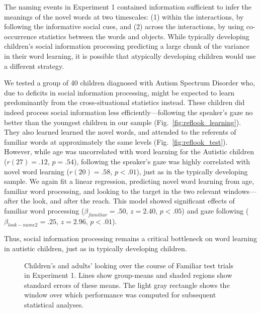 \documentclass{pnastwo}
\begin{document}
\begin{article}
The naming events in Experiment 1 contained information sufficient to infer the meanings of the novel words at two timescales: (1) within the interactions, by following the informative social cues, and (2) across the interactions, by using co-occurrence statistics between the words and objects. While typically developing children's social information processing predicting a large chunk of the variance in their word learning, it is possible that atypically developing children would use a different strategy.

We tested a group of 40 children diagnosed with Autism Spectrum Disorder who, due to deficits in social information processing, might be expected to learn predominantly from the cross-situational statistics instead. These children did indeed process social information less efficiently---following the speaker's gaze no better than the youngest children in our sample (Fig.~\ref{fig:reflook_learning}). They also learned learned the novel words, and attended to the referents of familiar words at approximately the same levels (Fig.~\ref{fig:reflook_test}). However, while age was uncorrelated with word learning for the Autistic children ($r(27) = .12$, $p =.54$), following the speaker's gaze was highly correlated with novel word learning ($r(20) = .58$, $p <.01$), just as in the typically developing sample. We again fit a linear regression, predicting novel word learning from age, familiar word processing, and looking to the target in the two relevant windows---after the look, and after the reach. This model showed significant effects of familiar word processing ($\beta_{familiar} = .50$, $z = 2.40$, $p < . 05$) and gaze following  ($\beta_{look-name2} = .25$, $z = 2.96$, $p < .01$).

Thus, social information processing remains a critical bottleneck on word learning in autistic children, just as in typically developing children.



\begin{figure}[tb]
	\caption{Children's and adults' looking over the course of Familiar test trials in Experiment 1. Lines show group-means and shaded regions show standard errors of these means. The light gray rectangle shows the window over which performance was computed for subsequent statistical analyses.}
	\label{fig:reflook_familiar} 
\end{figure}




\end{article}
\end{document}
